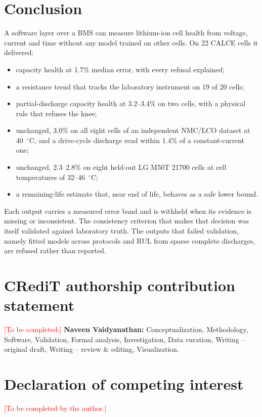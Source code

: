 \documentclass[preprint,12pt,authoryear]{elsarticle}
\begin{document}
\section{Conclusion}
\label{sec:conclusion}

A software layer over a BMS can measure lithium-ion cell health from voltage,
current and time without any model trained on other cells. On 22 CALCE cells it
delivered:
\begin{itemize}
\item capacity health at 1.7\% median error, with every refusal explained;
\item a resistance trend that tracks the laboratory instrument on 19 of 20
cells;
\item partial-discharge capacity health at 3.2--3.4\% on two cells, with a
physical rule that refuses the knee;
\item unchanged, 3.0\% on all eight cells of an independent NMC/LCO dataset at
40~$^\circ$C, and a drive-cycle discharge read within 1.4\% of a
constant-current one;
\item unchanged, 2.3--2.8\% on eight held-out LG M50T 21700 cells at cell
temperatures of 32--46~$^\circ$C;
\item a remaining-life estimate that, near end of life, behaves as a safe lower
bound.
\end{itemize}
Each output carries a measured error band and is withheld when its evidence is
missing or inconsistent. The consistency criterion that makes that decision was
itself validated against laboratory truth. The outputs that failed validation,
namely fitted models across protocols and RUL from sparse complete discharges,
are refused rather than reported.

\section*{CRediT authorship contribution statement}
\textcolor{red}{[To be completed.]} \textbf{Naveen Vaidyanathan:}
Conceptualization, Methodology, Software, Validation, Formal analysis,
Investigation, Data curation, Writing -- original draft, Writing -- review \&
editing, Visualization.

\section*{Declaration of competing interest}
\textcolor{red}{[To be completed by the author.]}
\end{document}
